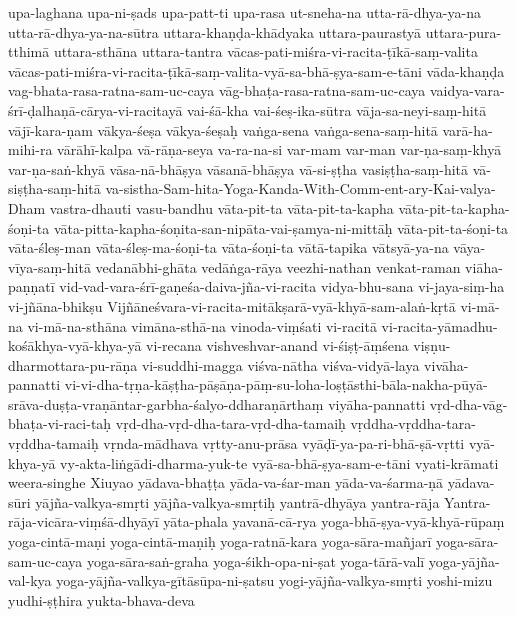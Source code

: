 {upa-laghana
upa-ni-ṣads
upa-patt-ti
upa-rasa
ut-sneha-na
utta-rā-dhya-ya-na
utta-rā-dhya-ya-na-sūtra
uttara-khaṇḍa-khādyaka
uttara-paurastyā
uttara-pura-tthimā
uttara-sthāna
uttara-tantra
vācas-pati-miśra-vi-racita-ṭīkā-saṃ-valita
vācas-pati-miśra-vi-racita-ṭīkā-saṃ-valita-vyā-sa-bhā-ṣya-sam-e-tāni
vāda-khaṇḍa
vag-bhata-rasa-ratna-sam-uc-caya
vāg-bhaṭa-rasa-ratna-sam-uc-caya
vaidya-vara-śrī-ḍalhaṇā-cārya-vi-racitayā
vai-śā-kha
vai-śeṣ-ika-sūtra
vāja-sa-neyi-saṃ-hitā
vājī-kara-ṇam
vākya-śeṣa
vākya-śeṣaḥ
vaṅga-sena
vaṅga-sena-saṃ-hitā
varā-ha-mihi-ra
vārāhī-kalpa
vā-rāṇa-seya
va-ra-na-si
var-mam
var-man
var-ṇa-saṃ-khyā
var-ṇa-saṅ-khyā
vāsa-nā-bhāṣya
vāsanā-bhāṣya
vā-si-ṣṭha
vasiṣṭha-saṃ-hitā
vā-siṣṭha-saṃ-hitā
va-sistha-Sam-hita-Yoga-Kanda-With-Comm-ent-ary-Kai-valya-Dham
vastra-dhauti
vasu-bandhu
vāta-pit-ta
vāta-pit-ta-kapha
vāta-pit-ta-kapha-śoṇi-ta
vāta-pitta-kapha-śoṇita-san-nipāta-vai-ṣamya-ni-mittāḥ
vāta-pit-ta-śoṇi-ta
vāta-śleṣ-man
vāta-śleṣ-ma-śoṇi-ta
vāta-śoṇi-ta
vātā-tapika
vātsyā-ya-na
vāya-vīya-saṃ-hitā
vedanābhi-ghāta
vedāṅga-rāya
veezhi-nathan
venkat-raman
viāha-paṇṇatī
vid-vad-vara-śrī-gaṇeśa-daiva-jña-vi-racita
vidya-bhu-sana
vi-jaya-siṃ-ha
vi-jñāna-bhikṣu
Vijñāneśvara-vi-racita-mitākṣarā-vyā-khyā-sam-alaṅ-kṛtā
vi-mā-na
vi-mā-na-sthāna
vimāna-sthā-na
vinoda-viṃśati
vi-racitā
vi-racita-yāmadhu-kośākhya-vyā-khya-yā
vi-recana
vishveshvar-anand
vi-śiṣṭ-āṃśena
viṣṇu-dharmottara-pu-rāṇa
vi-suddhi-magga
viśva-nātha
viśva-vidyā-laya
vivāha-pannatti
vi-vi-dha-tṛṇa-kāṣṭha-pāṣāṇa-pāṃ-su-loha-loṣṭāsthi-bāla-nakha-pūyā-srāva-duṣṭa-vraṇāntar-garbha-śalyo-ddharaṇārthaṃ
viyāha-pannatti
vṛd-dha-vāg-bhaṭa-vi-raci-taḥ
vṛd-dha-vṛd-dha-tara-vṛd-dha-tamaiḥ
vṛddha-vṛddha-tara-vṛddha-tamaiḥ
vṛnda-mādhava
vṛtty-anu-prāsa
vyāḍī-ya-pa-ri-bhā-ṣā-vṛtti
vyā-khya-yā
vy-akta-liṅgādi-dharma-yuk-te
vyā-sa-bhā-ṣya-sam-e-tāni
vyati-krāmati
weera-singhe
Xiuyao
yādava-bhaṭṭa
yāda-va-śar-man
yāda-va-śarma-ṇā
yādava-sūri
yājña-valkya-smṛti
yājña-valkya-smṛtiḥ
yantrā-dhyāya
yantra-rāja
Yantra-rāja-vicāra-viṃśā-dhyāyī
yāta-phala
yavanā-cā-rya
yoga-bhā-ṣya-vyā-khyā-rūpaṃ
yoga-cintā-maṇi
yoga-cintā-maṇiḥ
yoga-ratnā-kara
yoga-sāra-mañjarī
yoga-sāra-sam-uc-caya
yoga-sāra-saṅ-graha
yoga-śikh-opa-ni-ṣat
yoga-tārā-valī
yoga-yājña-val-kya
yoga-yājña-valkya-gītāsūpa-ni-ṣatsu
yogi-yājña-valkya-smṛti
yoshi-mizu
yudhi-ṣṭhira
yukta-bhava-deva
}
